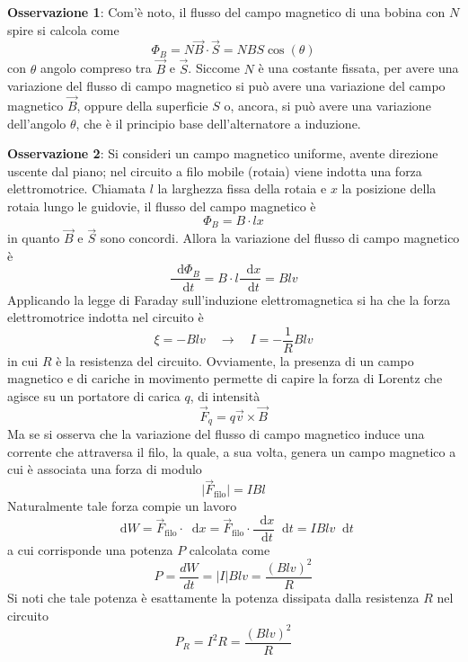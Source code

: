 \documentclass[a4paper]{extarticle}
\newcommand\dif{\mathop{}\!\mathrm{d}}
\begin{document}
\vspace{2em}
\noindent
\textbf{Osservazione 1}: Com'è noto, il flusso del campo magnetico di una bobina con $N$ spire si calcola come
\[\Phi_B = N \vec B \cdot \vec S = NBS \cos(\theta)\]
con $\theta$ angolo compreso tra $\vec B$ e $\vec S$. Siccome $N$ è una costante fissata, per avere una variazione del flusso di campo magnetico si può avere una variazione del campo magnetico $\vec B$, oppure della superficie $S$ o, ancora, si può avere una variazione dell'angolo $\theta$, che è il principio base dell'alternatore a induzione.

\vspace{2em}
\noindent
\textbf{Osservazione 2}: Si consideri un campo magnetico uniforme, avente direzione uscente dal piano; nel circuito a filo mobile (rotaia) viene indotta una forza elettromotrice. Chiamata $l$ la larghezza fissa della rotaia e $x$ la posizione della rotaia lungo le guidovie, il flusso del campo magnetico è
\[\Phi_B=B \cdot l x\]
in quanto $\vec B$ e $\vec S$ sono concordi. Allora la variazione del flusso di campo magnetico è
\[\dfrac{\dif \Phi_B}{\dif t} = B \cdot l \dfrac{\dif x}{\dif t} = B l v\]
Applicando la legge di Faraday sull'induzione elettromagnetica si ha che la forza elettromotrice indotta nel circuito è
\[\xi = - Blv \hspace{1em} \rightarrow \hspace{1em} I = - \dfrac{1}{R} B l v\]
in cui $R$ è la resistenza del circuito. Ovviamente, la presenza di un campo magnetico e di cariche in movimento permette di capire la forza di Lorentz che agisce su un portatore di carica $q$, di intensità
\[\vec F_q=q \vec v \times \vec B\]
Ma se si osserva che la variazione del flusso di campo magnetico induce una corrente che attraversa il filo, la quale, a sua volta, genera un campo magnetico a cui è associata una forza di modulo
\[\vert \vec F_\text{filo} \vert = I B l\] 
Naturalmente tale forza compie un lavoro
\[\dif W = \vec F_\text{filo} \cdot \dif x = \vec F_\text{filo} \cdot \dfrac{\dif x}{\dif t} \dif t = I B l v \dif t\]
a cui corrisponde una potenza $P$ calcolata come
\[P=\dfrac{dW}{dt}=\vert I \vert B l v = \frac{(B l v)^2}{R}\]
Si noti che tale potenza è esattamente la potenza dissipata dalla resistenza $R$ nel circuito
\[P_R = I^2 R = \dfrac{(Blv)^2}{R}\]

\vspace{1em}
\end{document}
